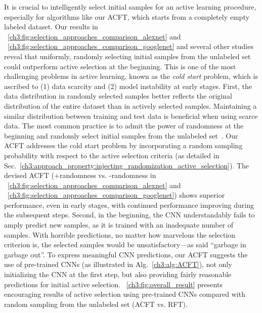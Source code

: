 It is crucial to intelligently select initial samples for an active learning procedure, especially for algorithms like our ACFT, which starts from a completely empty labeled dataset. Our results in \figurename~\ref{ch3:fig:selection_approaches_comparison_alexnet} and \figurename~\ref{ch3:fig:selection_approaches_comparison_googlenet} and several other studies~\citep{borisov2010active,zhou2017fine,yuan2020cold,gao2020consistency} reveal that uniformly, randomly selecting initial samples from the unlabeled set could outperform active selection at the beginning. This is one of the most challenging problems in active learning, known as the \textit{cold start} problem, which is ascribed to (1) data scarcity and (2) model instability at early stages. 
First, the data distribution in randomly selected samples better reflects the original distribution of the entire dataset than in actively selected samples. Maintaining a similar distribution between training and test data is beneficial when using scarce data. The most common practice is to admit the power of randomness at the beginning and randomly select initial samples from the unlabeled set~\citep{ren2020survey}. Our ACFT addresses the cold start problem by incorporating a random sampling probability with respect to the active selection criteria (as detailed in Sec.~\ref{ch3:approach_property:injecting_randomization_active_selection}). The devised ACFT (+randomness vs. -randomness in \figurename~\ref{ch3:fig:selection_approaches_comparison_alexnet} and \figurename~\ref{ch3:fig:selection_approaches_comparison_googlenet}) shows superior performance, even in early stages, with continued performance improving during the subsequent steps. 
Second, in the beginning, the CNN understandably fails to amply predict new samples, as it is trained with an inadequate number of samples. With horrible predictions, no matter how marvelous the selection criterion is, the selected samples would be unsatisfactory---as said ``garbage in garbage out''. To express meaningful CNN predictions, our ACFT suggests the use of pre-trained CNNs (as illustrated in Alg.~\ref{ch3:alg:ACFT}), not only initializing the CNN at the first step, but also providing fairly reasonable predictions for initial active selection. \figurename~\ref{ch3:fig:overall_result} presents encouraging results of active selection using pre-trained CNNs compared with random sampling from the unlabeled set (ACFT vs. RFT).
